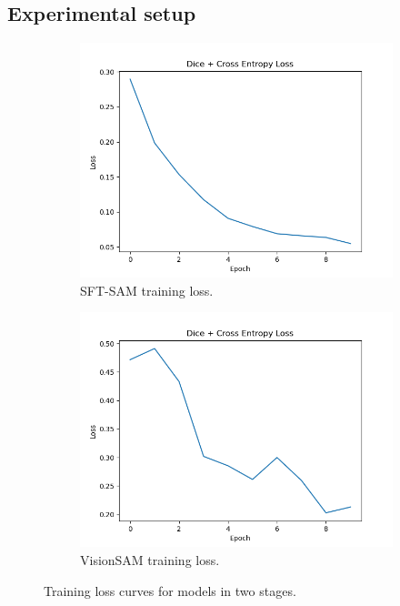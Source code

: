 \documentclass[11pt]{article}
\begin{document}
\subsection{Experimental setup}
\begin{figure}[ht]
  \centering
  \begin{subfigure}[t]{0.48\linewidth}
    \centering
    \includegraphics[width=\linewidth]{figs/sft_train.png}
    \caption{SFT-SAM training loss.}
    \label{fig:sft-loss}
  \end{subfigure}
  \hfill
  \begin{subfigure}[t]{0.48\linewidth}
    \centering
    \includegraphics[width=\linewidth]{figs/dpo_train.png}
    \caption{VisionSAM training loss.}
    \label{fig:vision-loss}
  \end{subfigure}
  \caption{Training loss curves for models in two stages.}
  \label{fig:loss-comparison}
\end{figure}
\end{document}
